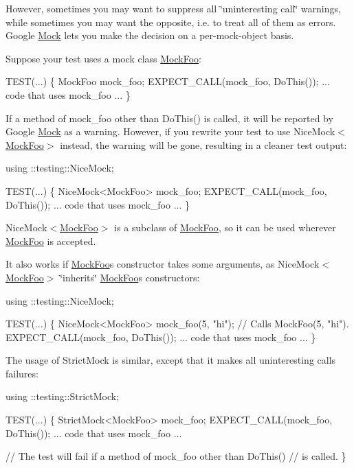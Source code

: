 However, sometimes you may want to suppress all \char`\"{}uninteresting call\char`\"{} warnings, while sometimes you may want the opposite, i.\+e. to treat all of them as errors. Google \hyperlink{classMock}{Mock} lets you make the decision on a per-\/mock-\/object basis.

Suppose your test uses a mock class {\ttfamily \hyperlink{classMockFoo}{Mock\+Foo}}\+:


\begin{DoxyCode}
TEST(...) \{
  MockFoo mock\_foo;
  EXPECT\_CALL(mock\_foo, DoThis());
  ... code that uses mock\_foo ...
\}
\end{DoxyCode}


If a method of {\ttfamily mock\+\_\+foo} other than {\ttfamily Do\+This()} is called, it will be reported by Google \hyperlink{classMock}{Mock} as a warning. However, if you rewrite your test to use {\ttfamily Nice\+Mock$<$\hyperlink{classMockFoo}{Mock\+Foo}$>$} instead, the warning will be gone, resulting in a cleaner test output\+:


\begin{DoxyCode}
using ::testing::NiceMock;

TEST(...) \{
  NiceMock<MockFoo> mock\_foo;
  EXPECT\_CALL(mock\_foo, DoThis());
  ... code that uses mock\_foo ...
\}
\end{DoxyCode}


{\ttfamily Nice\+Mock$<$\hyperlink{classMockFoo}{Mock\+Foo}$>$} is a subclass of {\ttfamily \hyperlink{classMockFoo}{Mock\+Foo}}, so it can be used wherever {\ttfamily \hyperlink{classMockFoo}{Mock\+Foo}} is accepted.

It also works if {\ttfamily \hyperlink{classMockFoo}{Mock\+Foo}}\textquotesingle{}s constructor takes some arguments, as {\ttfamily Nice\+Mock$<$\hyperlink{classMockFoo}{Mock\+Foo}$>$} \char`\"{}inherits\char`\"{} {\ttfamily \hyperlink{classMockFoo}{Mock\+Foo}}\textquotesingle{}s constructors\+:


\begin{DoxyCode}
using ::testing::NiceMock;

TEST(...) \{
  NiceMock<MockFoo> mock\_foo(5, \textcolor{stringliteral}{"hi"});  \textcolor{comment}{// Calls MockFoo(5, "hi").}
  EXPECT\_CALL(mock\_foo, DoThis());
  ... code that uses mock\_foo ...
\}
\end{DoxyCode}


The usage of {\ttfamily Strict\+Mock} is similar, except that it makes all uninteresting calls failures\+:


\begin{DoxyCode}
using ::testing::StrictMock;

TEST(...) \{
  StrictMock<MockFoo> mock\_foo;
  EXPECT\_CALL(mock\_foo, DoThis());
  ... code that uses mock\_foo ...

  \textcolor{comment}{// The test will fail if a method of mock\_foo other than DoThis()}
  \textcolor{comment}{// is called.}
\}
\end{DoxyCode}


